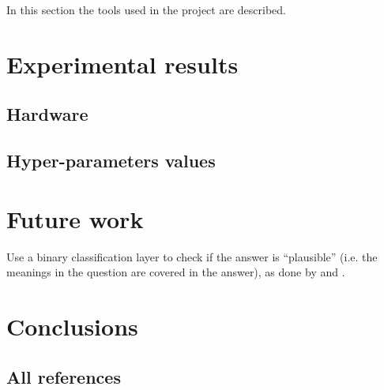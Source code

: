 \documentclass[11pt,hidelinks]{article}
\begin{document}

In this section the tools used in the project are described.

\section{Experimental results}\label{sec:experimental_results}


\subsection{Hardware}


\subsection{Hyper-parameters values}

\section{Future work}\label{sec:future_work}
Use a binary classification layer to check if the answer is ``plausible'' (i.e. the meanings in the question are covered in the answer), as done by \cite{Hu2019ReadV} and \cite{Back2020NeurQuRI}.



\section{Conclusions}\label{sec:conclusions}

\subsection{All references}
\end{document}
